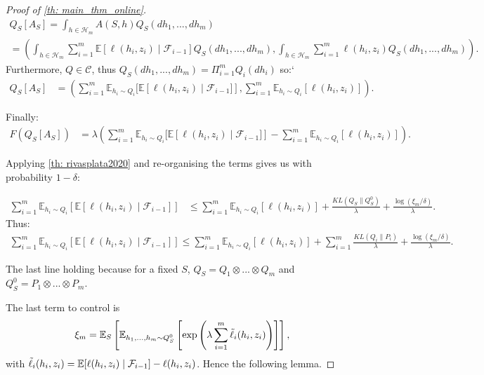 \begin{proof}[Proof of \cref{th: main_thm_online}]
\begin{multline*}
  Q_S[A_S]  = \int_{h\in\mathcal{H}_m} A(S,h) Q_S(dh_1,...,dh_m) \\
     = \left( \int_{h\in\mathcal{H}_m} \sum_{i=1}^m \mathbb{E}[\ell(h_i,z_i)\mid \mathcal{F}_{i-1}]Q_S(dh_1,...,dh_m), \int_{h\in\mathcal{H}_m}\sum_{i=1}^m \ell(h_i,z_i)  Q_S(dh_1,...,dh_m)    \right).
\end{multline*}
Furthermore, $Q\in\mathcal{C}$, thus $Q_S(dh_1,...,dh_m)= \Pi_{i=1}^m Q_i(dh_i)$ so:`
\begin{align*}
  Q_S[A_S] &= \left(  \sum_{i=1}^m \mathbb{E}_{h_i\sim Q_i}[\mathbb{E}\left[\ell(h_i,z_i)\mid \mathcal{F}_{i-1}]\right], \sum_{i=1}^m \mathbb{E}_{h_i\sim Q_i}[\ell(h_i,z_i)]       \right).
\end{align*}

Finally:
\begin{align*}
      F(Q_S[A_S])&= \lambda \left(\sum_{i=1}^m \mathbb{E}_{h_i\sim Q_i}[\mathbb{E}\left[\ell(h_i,z_i)\mid \mathcal{F}_{i-1}]\right]- \sum_{i=1}^m \mathbb{E}_{h_i\sim Q_i}[\ell(h_i,z_i)] \right).
\end{align*}


Applying \cref{th: rivasplata2020} and re-organising the terms gives us with probability $1-\delta$:

\begin{align*}
\sum_{i=1}^m \mathbb{E}_{h_i\sim Q_i}\left[\mathbb{E}[\ell(h_i,z_i)\mid \mathcal{F}_{i-1}]\right] & \leq \sum_{i=1}^m \mathbb{E}_{h_i\sim Q_i}[\ell(h_i,z_i)] + \frac{KL(Q_S\|Q^0_S)}{\lambda} + \frac{\log(\xi_m/\delta)}{\lambda}.
\end{align*}
\noindent Thus:
\begin{align}
  \label{eq: temp_result_online_thm}
 \sum_{i=1}^m \mathbb{E}_{h_i\sim Q_i}\left[\mathbb{E}[\ell(h_i,z_i)\mid \mathcal{F}_{i-1}]\right] \leq \sum_{i=1}^m \mathbb{E}_{h_i\sim Q_i}[\ell(h_i,z_i)] + \sum_{i=1}^m \frac{KL(Q_i\|P_i)}{\lambda} + \frac{\log(\xi_m/\delta)}{\lambda}.
\end{align}

\noindent The last line holding because for a fixed $S$, $Q_S= Q_1\otimes...\otimes Q_m$ and $Q_S^0= P_1\otimes...\otimes P_m$.

\noindent The last term to control is
\begin{align*}
\xi_m = \mathbb{E}_S\left[\mathbb{E}_{h_1,...,h_m \sim Q^0_S} \left[\exp\left(\lambda \sum_{i=1}^m \Tilde{\ell}_i(h_i,z_i)\right)\right]\right],
\end{align*}
with $\Tilde{\ell}_i(h_i,z_i)= \mathbb{E}[\ell(h_i,z_i)\mid \mathcal{F}_{i-1}]-  \ell(h_i,z_i)$. Hence the following lemma.


\end{proof}
